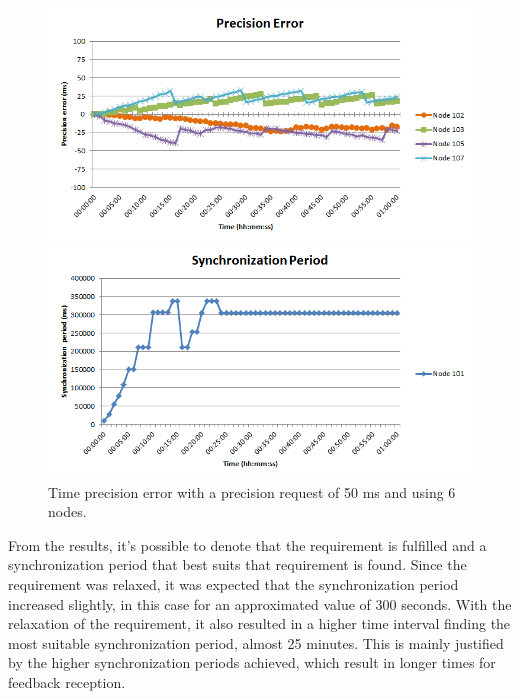 \documentclass[11pt,a4]{article}
\begin{document}
\begin{multicols}{2}
\begin{figure}[!t]
\begin{minipage}[b]{0.5\linewidth}
\includegraphics[scale=0.3]{./images/23-ttsp-50ms6nodes-error.png}
\end{minipage}
\hspace{0.5cm}
\begin{minipage}[b]{0.5\linewidth}
\includegraphics[scale=0.3]{./images/22-ttsp-50ms6nodes-period.png}
\end{minipage}
\caption{Time precision error with a precision request of 50 ms and using 6 nodes.}
\label{50ms6nodes}
\end{figure}

From the results, it's possible to denote that the requirement is fulfilled and a synchronization period that best suits that requirement is found. Since the requirement was relaxed, it was expected that the synchronization period increased slightly, in this case for an approximated value of 300 seconds. With the relaxation of the requirement, it also resulted in a higher time interval finding the most suitable synchronization period, almost 25 minutes. This is mainly justified by the higher synchronization periods achieved, which result in longer times for feedback reception. 


\end{multicols}
\end{document}
